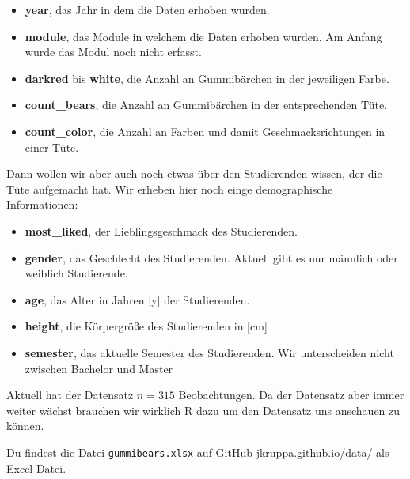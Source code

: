 \documentclass[
  letterpaper,
]{scrbook}
\providecommand{\tightlist}{%
  \setlength{\itemsep}{0pt}\setlength{\parskip}{0pt}}\usepackage{longtable,booktabs,array}
\begin{document}
\begin{itemize}
\tightlist
\item
  \textbf{year}, das Jahr in dem die Daten erhoben wurden.
\item
  \textbf{module}, das Module in welchem die Daten erhoben wurden. Am
  Anfang wurde das Modul noch nicht erfasst.
\item
  \textbf{darkred} bis \textbf{white}, die Anzahl an Gummibärchen in der
  jeweiligen Farbe.
\item
  \textbf{count\_bears}, die Anzahl an Gummibärchen in der
  entsprechenden Tüte.
\item
  \textbf{count\_color}, die Anzahl an Farben und damit
  Geschmacksrichtungen in einer Tüte.
\end{itemize}

Dann wollen wir aber auch noch etwas über den Studierenden wissen, der
die Tüte aufgemacht hat. Wir erheben hier noch einge demographische
Informationen:

\begin{itemize}
\tightlist
\item
  \textbf{most\_liked}, der Lieblingsgeschmack des Studierenden.
\item
  \textbf{gender}, das Geschlecht des Studierenden. Aktuell gibt es nur
  männlich oder weiblich Studierende.
\item
  \textbf{age}, das Alter in Jahren {[}y{]} der Studierenden.
\item
  \textbf{height}, die Körpergröße des Studierenden in {[}cm{]}
\item
  \textbf{semester}, das aktuelle Semester des Studierenden. Wir
  unterscheiden nicht zwischen Bachelor und Master
\end{itemize}

Aktuell hat der Datensatz \(n = 315\) Beobachtungen. Da der Datensatz
aber immer weiter wächst brauchen wir wirklich R dazu um den Datensatz
uns anschauen zu können.

\begin{tcolorbox}[enhanced jigsaw, coltitle=black, titlerule=0mm, bottomrule=.15mm, opacityback=0, opacitybacktitle=0.6, leftrule=.75mm, title=\textcolor{quarto-callout-tip-color}{\faLightbulb}\hspace{0.5em}{Datei für von Flöhen, Hunden und Katzen}, toprule=.15mm, bottomtitle=1mm, toptitle=1mm, left=2mm, breakable, arc=.35mm, colback=white, rightrule=.15mm, colbacktitle=quarto-callout-tip-color!10!white, colframe=quarto-callout-tip-color-frame]
Du findest die Datei \texttt{gummibears.xlsx} auf GitHub
\href{https://github.com/jkruppa/jkruppa.github.io/tree/master/data}{jkruppa.github.io/data/}
als Excel Datei.
\end{tcolorbox}
\end{document}
